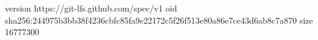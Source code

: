 version https://git-lfs.github.com/spec/v1
oid sha256:244975b3bb38f4236cbfc85fa9e22172c5f26f513e80a86e7ce43d6ab8c7a870
size 16777300
